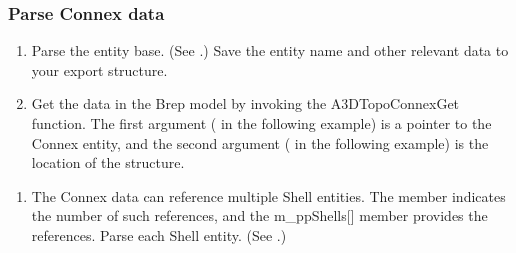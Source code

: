 \documentclass[letterpaper,12pt,english,openany,oneside]{sphinxmanual}
\begin{document}
\begin{sphinxVerbatim}[commandchars=\\\{\}]
 
\end{sphinxVerbatim}


\subsubsection{Parse Connex data}
\label{\detokenize{Plugins_A3D_API:parse-connex-data}}\begin{enumerate}
%
\item {} 
Parse the entity base. (See .) Save the entity name and other relevant data to your export structure.

\item {} 
Get the data in the Brep model by invoking the A3DTopoConnexGet function. The first argument ( in the following example) is a pointer to the Connex entity, and the second argument ( in the following example) is the location of the  structure.

\end{enumerate}

\begin{sphinxVerbatim}[commandchars=\\\{\}]
 
    
\end{sphinxVerbatim}
\begin{enumerate}
%
\setcounter{enumi}{2}
\item {} 
The Connex data can reference multiple Shell entities. The  member indicates the number of such references, and the m\_ppShells{[}{]} member provides the references. Parse each Shell entity. (See .)

\end{enumerate}
\end{document}
